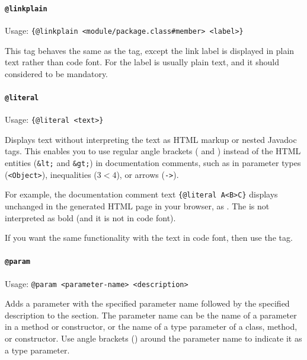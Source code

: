
\paragraph{\lstinline|@linkplain|}\label{sec:TagLinkplain}  Usage: \lstinline|{@linkplain <module/package.class#member> <label>}|

This tag behaves the same as the  tag, except the link label is displayed in plain text rather than code font. For  the label is usually plain text, and it should considered to be mandatory.


\paragraph{\lstinline|@literal|}\label{sec:TagLiteral}  Usage: \lstinline|{@literal <text>}| 

Displays text without interpreting the text as HTML markup or nested Javadoc tags.  This enables you to use regular angle brackets (\bdq{\textless} and \bdq{\textgreater}) instead of the HTML entities (\texttt{\&lt;} and \texttt{\&gt;}) in documentation comments, such as in parameter types (\texttt{<Object>}), inequalities ($3 < 4$), or arrows (\texttt{-\textgreater}).

For example, the documentation comment text \lstinline|{@literal A<B>C}| displays unchanged in the generated HTML page in your browser, as . The  is not interpreted as bold (and it is not in code font). 

If you want the same functionality with the text in code font, then use the  tag.


\paragraph{\lstinline|@param|}\label{sec:TagParam}  Usage: \lstinline|@param <parameter-name> <description>|

Adds a parameter with the specified parameter name followed by the specified description to the  section. The parameter name can be the name of a parameter in a method or constructor, or the name of a type parameter of a class, method, or constructor. Use angle brackets () around the parameter name to indicate it as a type parameter.

